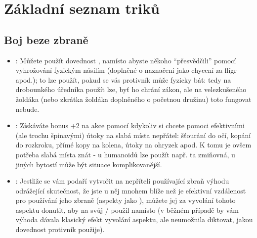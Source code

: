 \section{Základní seznam triků}
\label{sec:trik-zakladni}

\subsection{Boj beze zbraně}
\label{sec:trik-bbz}
\begin{itemize}
\item{}:
  \label{sec:bbz-jau}
  Můžete použít dovednost , namísto  abyste někoho ``přesvědčili'' pomocí vyhrožování fyzickým násilím (doplněné o naznačení jako chycení za flígr apod.); to lze použít, pokud se vás protivník může fyzicky bát: tedy na drobounkého úředníka  použít lze, byť ho chrání zákon, ale na velezkušeného žoldáka (nebo zkrátka žoldáka doplněného o početnou družinu) toto fungovat nebude.
\item{}:
  \label{sec:bbz-slabiny}
  Získáváte bonus +2 na akce  pomocí  kdykoliv si chcete pomoci efektivními (ale trochu špinavými) útoky na slabá místa nepřátel: šťourání do očí, kopání do rozkroku, přímé kopy na kolena, útoky na ohryzek apod. K tomu je ovšem potřeba slabá místa znát - u humanoidů lze použít např. ta zmiňovná, u jiných bytostí může být situace komplikovanější.
\item{}:
  Jestliže se vám podaří vytvořit na nepříteli používající zbraň výhodu odrážející skutečnost, že jste u něj mnohem blíže než je efektivní vzdálenost pro používání jeho zbraně (aspekty jako ), můžete jej za vyvolání tohoto aspektu donutit, aby na svůj / použil  namísto  (v běžném případě by vám výhoda dávala klasický efekt vyvolání aspektu, ale neumožnila diktovat, jakou dovednost protivník použije).
\end{itemize}

  
